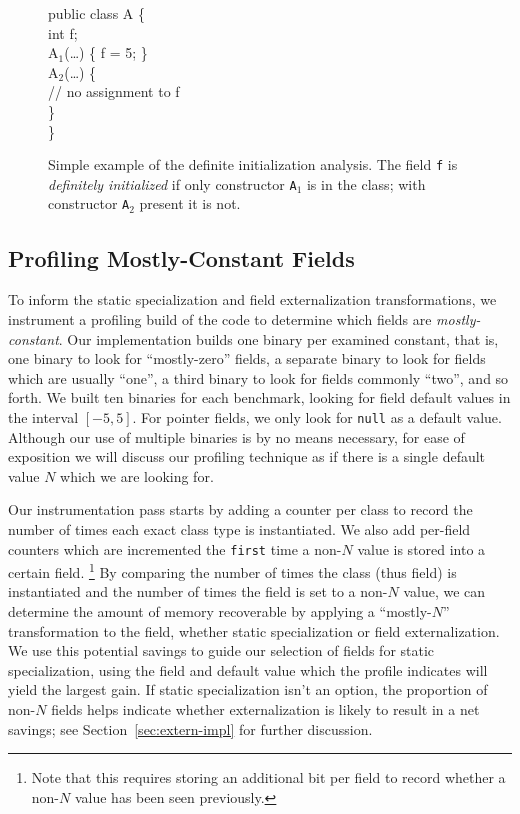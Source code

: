 \documentclass{acmconf}
\begin{document}
\begin{figure}
\begin{samplecode}
public class A \{\\
\>int f;\\
\>A$_1$(\ldots) \{ f = 5; \}\\
\>A$_2$(\ldots) \{\\
\>\>// no assignment to f\\
\>\}\\
\}\\
\end{samplecode}
\caption{Simple example of the definite initialization analysis.
The field {\tt f} is {\it definitely initialized} if only constructor
{\tt A$_1$} is in the class; with constructor {\tt A$_2$} present it
is not.}
\label{fig:definit-example}
\end{figure}

\subsection{Profiling Mostly-Constant Fields}
To inform the static specialization and field externalization
transformations, we instrument a profiling build of the code
to determine which fields are {\it mostly-constant}.  Our implementation
builds one binary per examined constant, that is, one binary to look
for ``mostly-zero'' fields, a separate binary to look for fields which
are usually ``one'', a third binary to look for fields commonly
``two'', and so forth.  We built ten binaries for each benchmark, looking for
field default values in the interval $[-5,5]$.
For pointer fields, we only look for {\tt null} as a default value.
Although our use of multiple binaries is by no means necessary,
for ease of exposition we will discuss our profiling technique
as if there is a single default value $N$ which we are looking for.

Our instrumentation pass starts by
adding a counter per class
to record the number of times each exact class type is instantiated.
We also add per-field counters which are incremented the {\tt first}
time a non-$N$ value is stored into a certain field.%
\footnote{Note that this requires storing an additional bit per field
  to record whether a non-$N$ value has been seen previously.}
By comparing the
number of times the class (thus field) is instantiated and the number
of times the field is set to a non-$N$ value, we can determine the
amount of memory recoverable by applying a ``mostly-$N$''
transformation to the field, whether static specialization or field
externalization.  We use this potential savings to guide our selection
of fields for static specialization, using the field and default value
which the profile indicates will yield the largest gain.  If static
specialization isn't an option, the
proportion of non-$N$ fields helps indicate whether externalization is
likely to result in a net savings; see Section~\ref{sec:extern-impl}
for further discussion.
\end{document}

